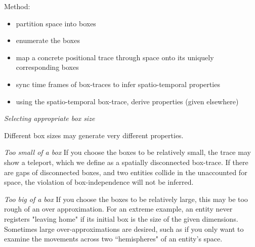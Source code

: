 Method:
\begin{itemize}
 \item partition space into boxes
 \item enumerate the boxes
 \item map a concrete positional trace through space onto its uniquely corresponding boxes
 \item sync time frames of box-traces to infer spatio-temporal properties
 \item using the spatio-temporal box-trace, derive properties (given elsewhere)
\end{itemize}

\emph{Selecting appropriate box size}

Different box sizes may generate very different properties.

\emph{Too small of a box} If you choose the boxes to be relatively small, the trace may show a teleport, which we define as a spatially disconnected box-trace.
If there are gaps of disconnected boxes, and two entities collide in the unaccounted for space, the violation of box-independence will not be inferred.

\emph{Too big of a box} If you choose the boxes to be relatively large, this may be too rough of an over approximation.
For an extreme example, an entity never registers "leaving home" if its initial box is the size of the given dimensions.
Sometimes large over-approximations are desired, such as if you only want to examine the movements across two ``hemispheres" of an entity's space.
